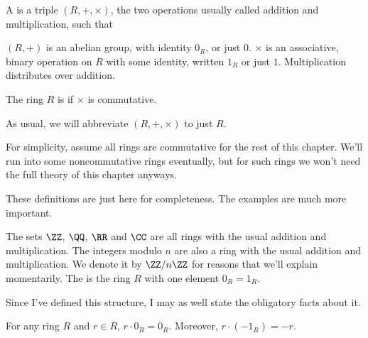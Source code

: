 \begin{definition}
	A  is a triple $(R, +, \times)$,
	the two operations usually called addition and multiplication, such that
	\begin{enumerate}[(i)]
		\ii $(R,+)$ is an abelian group, with identity $0_R$, or just $0$.
		\ii $\times$ is an associative, binary operation on $R$ with some
		identity, written $1_R$ or just $1$.
		\ii Multiplication distributes over addition.
	\end{enumerate}
	The ring $R$ is  if $\times$ is commutative.
\end{definition}
\begin{abuse}
	As usual, we will abbreviate $(R, +, \times)$ to just $R$.
\end{abuse}
\begin{abuse}
	For simplicity, assume all rings are commutative
	for the rest of this chapter.
	We'll run into some noncommutative rings eventually,
	but for such rings we won't need the full theory of this chapter anyways.
\end{abuse}

These definitions are just here for completeness.
The examples are much more important.
\begin{example}
	\listhack
	\begin{enumerate}[(a)]
		\ii The sets $\ZZ$, $\QQ$, $\RR$ and $\CC$ are all rings
		with the usual addition and multiplication.
		\ii The integers modulo $n$ are also a ring
		with the usual addition and multiplication.
		We denote it by $\ZZ / n\ZZ$ for reasons that we'll explain momentarily.
		\ii The  is the ring $R$ with one element $0_R = 1_R$.
	\end{enumerate}
\end{example}

Since I've defined this structure, I may as well state the obligatory facts about it.
\begin{fact}
	For any ring $R$ and $r \in R$, $r \cdot 0_R = 0_R$.
	Moreover, $r \cdot (-1_R) = -r$.
\end{fact}

